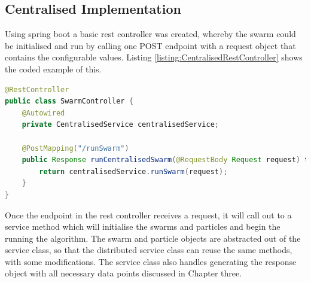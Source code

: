 \documentclass[oneside,12pt]{book}
\begin{document}
\subsection{Centralised Implementation}
Using spring boot a basic rest controller was created, whereby the swarm could be initialised and run by calling one POST endpoint with a request object that contains the configurable values. Listing \ref{listing:CentralisedRestController} shows the coded example of this. 
\begin{lstlisting}[basicstyle=\footnotesize, language=Java]
@RestController
public class SwarmController {
    @Autowired
    private CentralisedService centralisedService;

    @PostMapping("/runSwarm")
    public Response runCentralisedSwarm(@RequestBody Request request) throws Exception {
        return centralisedService.runSwarm(request);
    }
}
\end{lstlisting}
\label{listing:CentralisedRestController}

Once the endpoint in the rest controller receives a request, it will call out to a service method which will initialise the swarms and particles and begin the running the algorithm. The swarm and particle objects are abstracted out of the service class, so that the distributed service class can reuse the same methods, with some modifications. The service class also handles generating the response object with all necessary data points discussed in Chapter three. 
\end{document}
